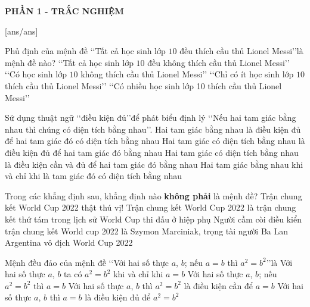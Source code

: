 
\begin{center}
	\textbf{PHẦN 1 - TRẮC NGHIỆM}
\end{center}
[ans/ans]
\begin{ex}%
	Phủ định của mệnh đề \lq\lq Tất cả học sinh lớp $10$ đều thích cầu thủ Lionel Messi\rq\rq là mệnh đề nào?
	\choice
	{\lq\lq Tất cả học sinh lớp $10$ đều không thích cầu thủ Lionel Messi\rq\rq}
	{\True \lq\lq Có học sinh lớp $10$ không thích cầu thủ Lionel Messi\rq\rq}
	{\lq\lq Chỉ có ít học sinh lớp $10$ thích cầu thủ Lionel Messi\rq\rq}
	{\lq\lq Có nhiều học sinh lớp 10 thích cầu thủ Lionel Messi\rq\rq}
\end{ex}
\begin{ex}%
	Sử dụng thuật ngữ \lq\lq điều kiện đủ\rq\rq để phát biểu định lý \lq\lq Nếu hai tam giác bằng nhau thì chúng có diện tích bằng nhau\rq\rq.
	\choice
	{\True Hai tam giác bằng nhau là điều kiện đủ để hai tam giác đó có diện tích bằng nhau}
	{Hai tam giác có diện tích bằng nhau là điều kiện đủ để hai tam giác đó bằng nhau}
	{Hai tam giác có diện tích bằng nhau là điều kiện cần và đủ để hai tam giác đó bằng nhau}
	{Hai tam giác bằng nhau khi và chỉ khi là tam giác đó có diện tích bằng nhau}
\end{ex}
\begin{ex}%
	Trong các khẳng định sau, khẳng định nào \textbf{không phải} là mệnh đề?
	\choice
	{\True Trận chung kết World Cup 2022 thật thú vị!}
	{Trận chung kết World Cup 2022 là trận chung kết thứ tám trong lịch sử World Cup thi đấu ở hiệp phụ}
	{Người cầm còi điều kiển trận chung kết World cup 2022 là Szymon Marciniak, trọng tài người Ba Lan}
	{Argentina vô địch World Cup 2022}
\end{ex}
\begin{ex}%
	Mệnh đều đảo của mệnh đề \lq\lq Với hai số thực $a$, $b$; nếu $a=b$ thì $a^2=b^2$\rq\rq là
	\choice
	{Với hai số thực $a$, $b$ ta có $a^2=b^2$ khi và chỉ khi $a=b$}
	{\True Với hai số thực $a$, $b$; nếu $a^2=b^2$ thì $a=b$}
	{Với hai số thực $a$, $b$ thì $a^2=b^2$ là điều kiện cần để $a=b$}
	{Với hai số thực $a$, $b$ thì $a=b$ là điều kiện đủ để $a^2=b^2$}
\end{ex}
